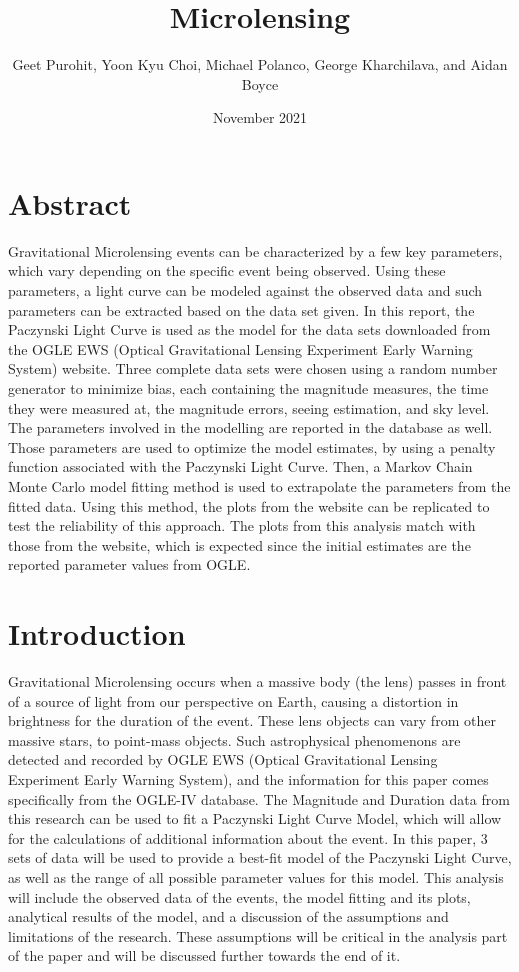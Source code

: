 \documentclass{article}
\title{Microlensing}
\author{Geet Purohit, Yoon Kyu Choi, Michael Polanco, George Kharchilava, and Aidan Boyce}
\date{November 2021}
\begin{document}


\section{Abstract}
Gravitational Microlensing events can be characterized by a few key parameters, which vary depending on the specific event being observed. Using these parameters, a light curve can be modeled against the observed data and such parameters can be extracted based on the data set given. In this report, the Paczynski Light Curve is used as the model for the data sets downloaded from the OGLE EWS (Optical Gravitational Lensing Experiment Early Warning System) website. Three complete data sets were chosen using a random number generator to minimize bias, each containing the magnitude measures, the time they were measured at, the magnitude errors, seeing estimation, and sky level. The parameters involved in the modelling are reported in the database as well. Those parameters are used to optimize the model estimates, by using a penalty function associated with the Paczynski Light Curve. Then, a Markov Chain Monte Carlo model fitting method is used to extrapolate the parameters from the fitted data. Using this method, the plots from the website can be replicated to test the reliability of this approach. The plots from this analysis match with those from the website, which is expected since the initial estimates are the reported parameter values from OGLE. 

\section{Introduction}

Gravitational Microlensing occurs when a massive body (the lens) passes in front of a source of light from our perspective on Earth, causing a distortion in brightness for the duration of the event. These lens objects can vary from other massive stars, to point-mass objects. Such astrophysical phenomenons are detected and recorded by OGLE EWS (Optical Gravitational Lensing Experiment Early Warning System), and the information for this paper comes specifically from the OGLE-IV database. The Magnitude and Duration data from this research can be used to fit a Paczynski Light Curve Model, which will allow for the calculations of additional information about the event. In this paper, 3 sets of data will be used to provide a best-fit model of the Paczynski Light Curve, as well as the range of all possible parameter values for this model. This analysis will include the observed data of the events, the model fitting and its plots, analytical results of the model, and a discussion of the assumptions and limitations of the research. These assumptions will be critical in the analysis part of the paper and will be discussed further towards the end of it. 
\end{document}
